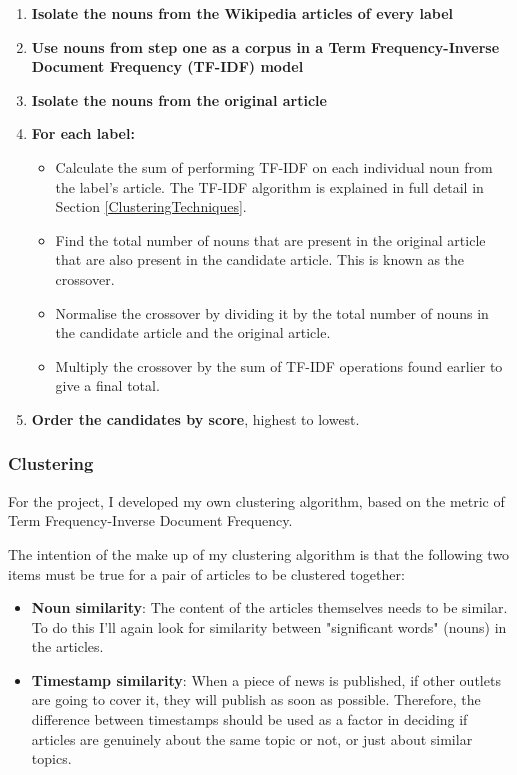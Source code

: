 \documentclass[12pt]{article}
\begin{document}
\begin{enumerate}
	\item \textbf{Isolate the nouns from the Wikipedia articles of every label}
	\item \textbf{Use nouns from step one as a corpus in a Term Frequency-Inverse Document Frequency (TF-IDF) model} 
	\item \textbf{Isolate the nouns from the original article} 
	\item \textbf{For each label:}
		\begin{itemize}
			\item Calculate the sum of performing TF-IDF on each individual noun from the label's article. The TF-IDF algorithm is explained in full detail in Section \ref{ClusteringTechniques}. 
			\item Find the total number of nouns that are present in the original article that are also present in the candidate article. This is known as the crossover. 
			\item Normalise the crossover by dividing it by the total number of nouns in the candidate article and the original article. 
			\item Multiply the crossover by the sum of TF-IDF operations found earlier to give a final total. 
		\end{itemize}
	\item \textbf{Order the candidates by score}, highest to lowest.
\end{enumerate}

\subsubsection{Clustering}

For the project, I developed my own clustering algorithm, based on the metric of Term Frequency-Inverse Document Frequency. 

The intention of the make up of my clustering algorithm is that the following two items must be true for a pair of articles to be clustered together: \\

\begin{itemize}
	\item \textbf{Noun similarity}: The content of the articles themselves needs to be similar. To do this I'll again look for similarity between "significant words" (nouns) in the articles. 
	\item \textbf{Timestamp similarity}: When a piece of news is published, if other outlets are going to cover it, they will publish as soon as possible. Therefore, the difference between timestamps should be used as a factor in deciding if articles are genuinely about the same topic or not, or just about similar topics. 
\end{itemize}
\end{document}
